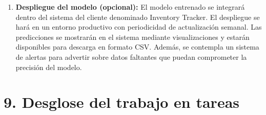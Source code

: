 \documentclass[
11pt, %
]{charter}
\begin{document}
\begin{enumerate}
  \item \textbf{Despliegue del modelo (opcional):}  
  El modelo entrenado se integrará dentro del sistema del cliente denominado Inventory Tracker. El despliegue se hará en un entorno productivo con periodicidad de actualización semanal. Las predicciones se mostrarán en el sistema mediante visualizaciones y estarán disponibles para descarga en formato CSV. Además, se contempla un sistema de alertas para advertir sobre datos faltantes que puedan comprometer la precisión del modelo.
\end{enumerate}

\section{9. Desglose del trabajo en tareas}
\label{sec:wbs}
\end{document}
